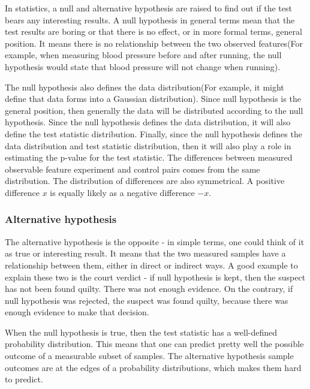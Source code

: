 \documentclass[12pt]{article}
\begin{document}
In statistics, a null and alternative hypothesis are raised to find out if the test bears any interesting results. A null hypothesis in general terms mean that the test results are boring or that there is no effect, or in more formal terms, general position. It means there is no relationship between the two observed features(For example, when measuring blood pressure before and after running, the null hypothesis would state that blood pressure will not change when running).

The null hypothesis also defines the data distribution(For example, it might define that data forms into a Gaussian distribution). Since null hypothesis is the general position, then generally the data will be distributed according to the null hypothesis. Since the null hypothesis defines the data distribution, it will also define the test statistic distribution. Finally, since the null hypothesis defines the data distribution and test statistic distribution, then it will also play a role in estimating the p-value for the test statistic. The differences between measured observable feature experiment and control pairs comes from the same distribution. The distribution of differences are also symmetrical. A positive difference $x$ is equally likely as a negative difference $-x$.

\subsubsection{Alternative hypothesis}
The alternative hypothesis is the opposite - in simple terms, one could think of it as true or interesting result. It means that the two measured samples have a relationship between them, either in direct or indirect ways. A good example to explain these two is the court verdict - if null hypothesis is kept, then the suspect has not been found quilty. There was not enough evidence. On the contrary, if null hypothesis was rejected, the suspect was found quilty, because there was enough evidence to make that decision.

When the null hypothesis is true, then the test statistic has a well-defined probability distribution. This means that one can predict pretty well the possible outcome of a measurable subset of samples. The alternative hypothesis sample outcomes are at the edges of a probability distributions, which makes them hard to predict.
\end{document}
